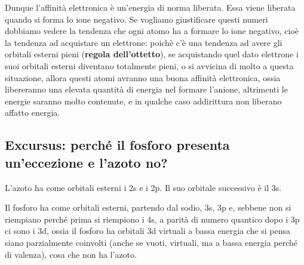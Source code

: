 Dunque l'affinità elettronica è un'energia di norma liberata. Essa viene liberata quando si forma lo ione negativo. Se vogliamo giustificare questi numeri dobbiamo vedere la tendenza che ogni atomo ha a formare lo ione negativo, cioè la tendenza ad acquistare un elettrone: poichè c'è una tendenza ad avere gli orbitali esterni pieni (\textbf{regola dell'ottetto}), se acquistando quel dato elettrone i suoi orbitali esterni diventano totalmente pieni, o si avvicina di molto a questa situazione, allora questi atomi avranno una buona affinità elettronica, ossia libereranno una elevata quantità di energia nel formare l'anione, altrimenti le energie saranno molto contenute, e in qualche caso addirittura non liberano affatto energia.
\subsection{Excursus: perché il fosforo presenta un'eccezione e l'azoto no?}
L'azoto ha come orbitali esterni i 2s e i 2p. Il suo orbitale successivo è il 3s.

Il fosforo ha come orbitali esterni, partendo dal sodio, 3s, 3p e, sebbene non si riempiano perché prima si riempiono i 4s, a parità di numero quantico dopo i 3p ci sono i 3d, ossia il fosforo ha orbitali 3d virtuali a bassa energia che si pensa siano parzialmente coinvolti (anche se vuoti, virtuali, ma a bassa energia perché di valenza), cosa che non ha l'azoto.

